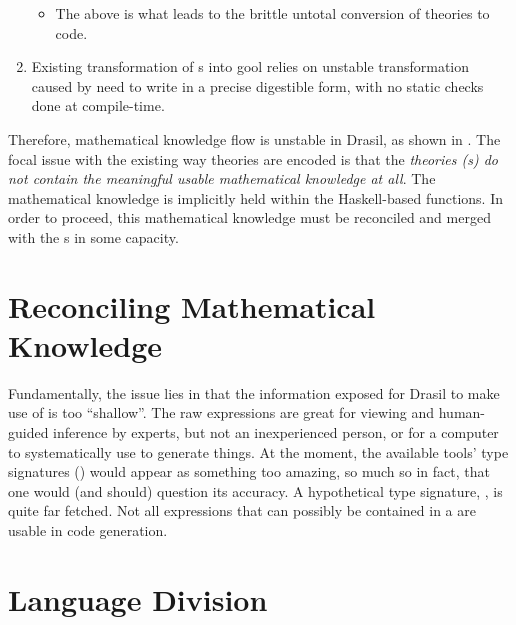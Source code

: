 \begin{enumerate}
\begin{itemize}
		      \item The above is what leads to the brittle untotal conversion of
		            theories to code.

	      \end{itemize}

	\item Existing transformation of \RelationConcept{}s into \acs{gool} relies
	      on unstable transformation caused by need to write in a precise
	      digestible form, with no static checks done at compile-time.

\end{enumerate}

Therefore, mathematical knowledge flow is unstable in Drasil, as shown in
. The focal issue with the existing way theories
are encoded is that the \textit{theories (\RelationConcept{}s) do not contain
	the meaningful usable mathematical knowledge at all}. The mathematical knowledge
is implicitly held within the Haskell-based functions. In order to proceed, this mathematical knowledge
must be reconciled and merged with the \RelationConcept{}s in some capacity.

\theoriesWithoutModelKinds{}

\section{Reconciling Mathematical Knowledge}

Fundamentally, the issue lies in that the information exposed for Drasil to make
use of is too ``shallow''. The raw expressions are great for viewing and
human-guided inference by experts, but not an inexperienced person, or for a
computer to systematically use to generate things. At the moment, the available
tools' type signatures () would appear as something
too amazing, so much so in fact, that one would (and should) question its
accuracy. A hypothetical type signature, , is
quite far fetched. Not all expressions that can possibly be contained in a
\RelationConcept{} are usable in code generation.

\section{Language Division}

